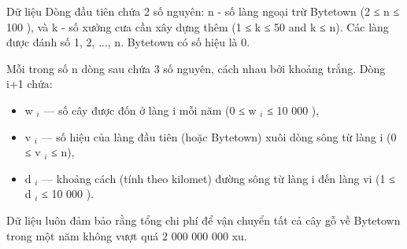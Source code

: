 Dữ liệu
Dòng đầu tiên chứa 2 số nguyên: n - số làng ngoại trừ Bytetown (2 ≤ n ≤ 100 ), và k - số xưởng cưa cần xây dựng thêm (1 ≤ k ≤ 50 and k ≤ n). Các làng được đánh số 1, 2, ..., n. Bytetown có số hiệu là 0.  

   Mỗi trong số n dòng sau chứa 3 số nguyên, cách nhau bởi khoảng trắng. Dòng i+1 chứa:  
\begin{itemize}
	\item     w    $_     i    $    — số cây được đốn ở làng i mỗi năm (0 ≤ w    $_     i    $    ≤ 10 000 ),   
	\item     v    $_     i    $    — số hiệu của làng đầu tiên (hoặc Bytetown) xuôi dòng sông từ làng i (0 ≤ v    $_     i    $    ≤ n),   
	\item     d    $_     i    $    — khoảng cách (tính theo kilomet) đường sông từ làng i đến làng vi (1 ≤ d    $_     i    $    ≤ 10 000 ).   
\end{itemize}

   Dữ liệu luôn đảm bảo rằng tổng chi phí để vận chuyển tất cả cây gỗ về Bytetown trong một năm không vượt quá 2 000 000 000 xu.